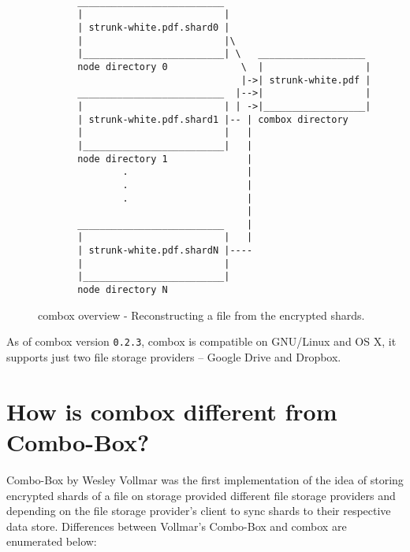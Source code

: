 \begin{figure}[h]
\begin{verbatim}

       __________________________
       |                         |
       | strunk-white.pdf.shard0 |
       |                         |\
       |_________________________| \   ___________________
       node directory 0             \  |                  |
                                    |->| strunk-white.pdf |
       __________________________  |-->|                  |
       |                         | | ->|__________________|
       | strunk-white.pdf.shard1 |-- | combox directory
       |                         |   |
       |_________________________|   |
       node directory 1              |
               .                     |
               .                     |
               .                     |
                                     |
       __________________________    |
       |                         |   |
       | strunk-white.pdf.shardN |----
       |                         |
       |_________________________|
       node directory N

\end{verbatim}
  \caption{combox overview - Reconstructing a file from the encrypted
    shards.}
  \label{fig:1-combox-overview-1}
\end{figure}

As of combox version \verb+0.2.3+, combox is compatible on GNU/Linux
and OS X, it supports just two file storage providers -- Google Drive
and Dropbox.

\section{How is combox different from Combo-Box?}\label{1-sec-cb-diff}

Combo-Box by Wesley Vollmar \cite{vollmar-combo-box} was the first
implementation of the idea of storing encrypted shards of a file on
storage provided different file storage providers and depending on the
file storage provider's client to sync shards to their respective data
store. Differences between Vollmar's Combo-Box and combox are
enumerated below:

